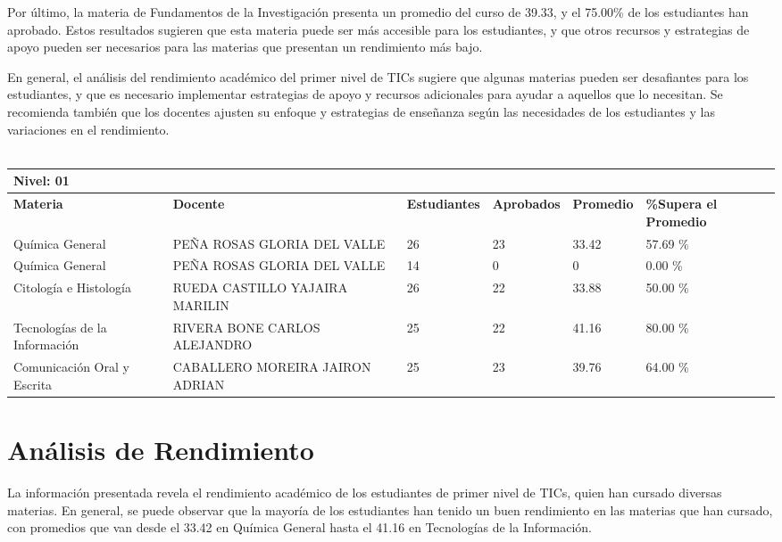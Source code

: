 Por último, la materia de Fundamentos de la Investigación presenta un promedio del curso de 39.33, y el 75.00\% de los estudiantes han aprobado. Estos resultados sugieren que esta materia puede ser más accesible para los estudiantes, y que otros recursos y estrategias de apoyo pueden ser necesarios para las materias que presentan un rendimiento más bajo.

En general, el análisis del rendimiento académico del primer nivel de TICs sugiere que algunas materias pueden ser desafiantes para los estudiantes, y que es necesario implementar estrategias de apoyo y recursos adicionales para ayudar a aquellos que lo necesitan. Se recomienda también que los docentes ajusten su enfoque y estrategias de enseñanza según las necesidades de los estudiantes y las variaciones en el rendimiento.\\
\vspace{1cm}\\\small
\begin{tabularx}{\textwidth}{|p{2.5cm}|p{2.5cm}|X|X|X|X|}
\hline
\multicolumn{6}{|X|}{\textbf{Nivel: 01 }}\\\hline\textbf{Materia} & \textbf{Docente} & \textbf{Estudiantes} & \textbf{Aprobados} & \textbf{Promedio} & \textbf{\%Supera el Promedio} \\ \hline
Química General & PEÑA ROSAS GLORIA DEL VALLE & 26 & 23 & 33.42 & 57.69 \%\\ \hline
Química General & PEÑA ROSAS GLORIA DEL VALLE & 14 & 0 & 0 & 0.00 \%\\ \hline
Citología e Histología & RUEDA CASTILLO YAJAIRA MARILIN & 26 & 22 & 33.88 & 50.00 \%\\ \hline
Tecnologías de la Información  & RIVERA BONE CARLOS ALEJANDRO & 25 & 22 & 41.16 & 80.00 \%\\ \hline
Comunicación Oral y Escrita & CABALLERO MOREIRA JAIRON ADRIAN & 25 & 23 & 39.76 & 64.00 \%\\ \hline
\end{tabularx}

\vspace{1cm}
\section{Análisis de Rendimiento}
La información presentada revela el rendimiento académico de los estudiantes de primer nivel de TICs, quien han cursado diversas materias. En general, se puede observar que la mayoría de los estudiantes han tenido un buen rendimiento en las materias que han cursado, con promedios que van desde el 33.42 en Química General hasta el 41.16 en Tecnologías de la Información.

